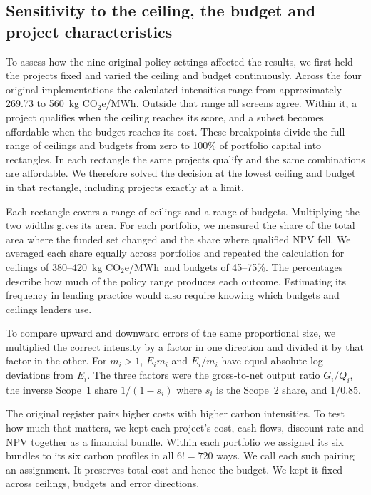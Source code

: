 \documentclass[ijfs,article,submit,oneauthor]{Definitions/mdpi}
\newcommand{\unit}{kg CO$_2$e/MWh}
\begin{document}
\subsection{Sensitivity to the ceiling, the budget and project characteristics}
To assess how the nine original policy settings affected the results, we first held the projects fixed and varied the ceiling and budget continuously. Across the four original implementations the calculated intensities range from approximately 269.73 to 560~\unit. Outside that range all screens agree. Within it, a project qualifies when the ceiling reaches its score, and a subset becomes affordable when the budget reaches its cost. These breakpoints divide the full range of ceilings and budgets from zero to 100\% of portfolio capital into rectangles. In each rectangle the same projects qualify and the same combinations are affordable. We therefore solved the decision at the lowest ceiling and budget in that rectangle, including projects exactly at a limit.

Each rectangle covers a range of ceilings and a range of budgets. Multiplying the two widths gives its area. For each portfolio, we measured the share of the total area where the funded set changed and the share where qualified NPV fell. We averaged each share equally across portfolios and repeated the calculation for ceilings of 380--420~\unit\ and budgets of 45--75\%. The percentages describe how much of the policy range produces each outcome. Estimating its frequency in lending practice would also require knowing which budgets and ceilings lenders use.

To compare upward and downward errors of the same proportional size, we multiplied the correct intensity by a factor in one direction and divided it by that factor in the other. For $m_i>1$, $E_i m_i$ and $E_i/m_i$ have equal absolute log deviations from $E_i$. The three factors were the gross-to-net output ratio $G_i/Q_i$, the inverse Scope~1 share $1/(1-s_i)$ where $s_i$ is the Scope~2 share, and $1/0.85$.

The original register pairs higher costs with higher carbon intensities. To test how much that matters, we kept each project's cost, cash flows, discount rate and NPV together as a financial bundle. Within each portfolio we assigned its six bundles to its six carbon profiles in all $6!=720$ ways. We call each such pairing an assignment. It preserves total cost and hence the budget. We kept it fixed across ceilings, budgets and error directions.
\end{document}
